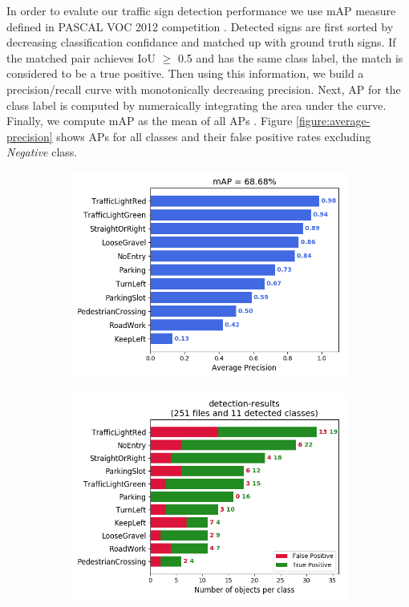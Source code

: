 In order to evalute our traffic sign detection performance we use mAP measure
defined in PASCAL VOC 2012 competition \cite{Everingham2010ThePV}. Detected
signs are first sorted by decreasing classification confidance and matched up
with ground truth signs. If the matched pair achieves IoU $\ge$ 0.5 and has the
same class label, the match is considered to be a true positive. Then using
this information, we build a precision/recall curve with monotonically
decreasing precision. Next, AP for the class label is computed by numeraically
integrating the area under the curve. Finally, we compute mAP as the mean of
all APs \cite{Cartucho2019MAP}. Figure \ref{figure:average-precision} shows APs
for all classes and their false positive rates excluding \textit{Negative}
class.

\begin{figure}[h]
  \centering
  \begin{subfigure}[b]{0.45\linewidth}
    \includegraphics[width=\linewidth]{figures/experiments/mAP.png}
    \caption{}
  \end{subfigure}
  \begin{subfigure}[b]{0.45\linewidth}
    \includegraphics[width=\linewidth]{figures/experiments/detection-results-info.png}

\end{subfigure}
\end{figure}
